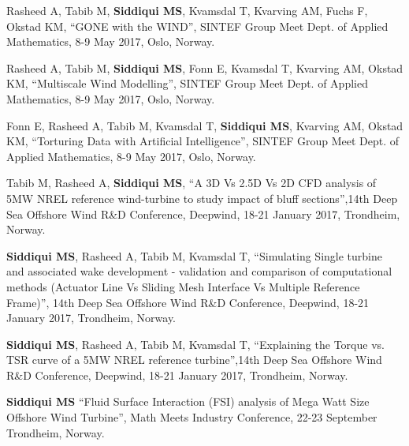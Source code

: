 

\begin{cventries}
	
	\cventry
	{} %
	{} %
	{} %
	{} %
	{
		\begin{cvitems} %
			\item {Rasheed A, Tabib M,  \textbf{Siddiqui MS}, Kvamsdal T, Kvarving AM, Fuchs F, Okstad KM, “GONE with the WIND”, SINTEF Group Meet Dept. of Applied Mathematics, 8-9 May 2017, Oslo, Norway.}
			\item {Rasheed A, Tabib M,  \textbf{Siddiqui MS}, Fonn E, Kvamsdal T, Kvarving AM, Okstad KM, “Multiscale Wind Modelling”, SINTEF Group Meet Dept. of Applied Mathematics, 8-9 May 2017, Oslo, Norway.}
			\item {Fonn E, Rasheed A, Tabib M, Kvamsdal T,  \textbf{Siddiqui MS}, Kvarving AM, Okstad KM, “Torturing Data with Artificial Intelligence”, SINTEF Group Meet Dept. of Applied Mathematics, 8-9 May 2017, Oslo, Norway.}
			\item {Tabib M, Rasheed A, \textbf{Siddiqui MS}, “A 3D Vs 2.5D Vs 2D CFD analysis of 5MW NREL reference wind-turbine to study impact of bluff sections”,14th Deep Sea Offshore Wind R\&D Conference, Deepwind, 18-21 January 2017, Trondheim, Norway.}
			\item {\textbf{Siddiqui MS}, Rasheed A, Tabib M, Kvamsdal T, “Simulating Single turbine and associated wake development - validation and comparison of computational methods (Actuator Line Vs Sliding Mesh Interface Vs Multiple Reference Frame)”, 14th Deep Sea Offshore Wind R\&D Conference, Deepwind, 18-21 January 2017, Trondheim, Norway.}
			\item {\textbf{Siddiqui MS}, Rasheed A, Tabib M, Kvamsdal T, “Explaining the Torque vs. TSR  curve of a 5MW NREL reference turbine”,14th Deep Sea Offshore Wind R\&D Conference, Deepwind, 18-21 January 2017, Trondheim, Norway.}
			\item {\textbf{Siddiqui MS} “Fluid Surface Interaction (FSI) analysis of Mega Watt Size Offshore Wind Turbine”, Math Meets Industry Conference, 22-23 September Trondheim, Norway.}    

\end{cvitems}}
\end{cventries}
